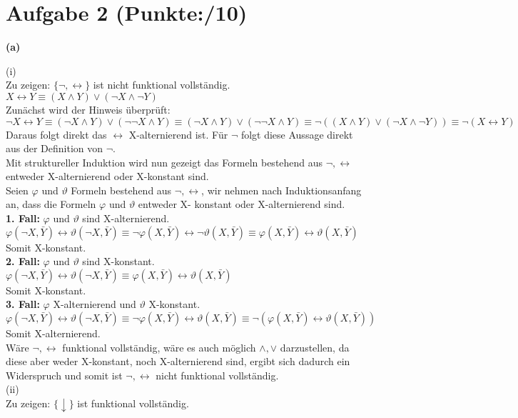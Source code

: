 \documentclass[11pt, a4paper]{article}
\newcommand{\p}{10}
\begin{document}
\section*{Aufgabe 2 (Punkte:\qquad/\p)}
\textbf{(a)}
\begin{adjustwidth}{20pt}{20pt}
(i)\\
Zu zeigen: $\{\neg , \leftrightarrow \}$ ist nicht funktional vollständig.\\
$X \leftrightarrow Y \equiv (X \wedge Y) \vee (\neg X \wedge \neg Y ) $\\ 
Zunächst wird der Hinweis überprüft:\\
$\neg X \leftrightarrow Y \equiv ( \neg X \wedge Y) \vee ( \neg \neg X \wedge Y) \equiv ( 
\neg X \wedge Y) \vee ( \neg \neg X \wedge Y) \equiv \neg ((X \wedge Y) \vee (\neg X
\wedge \neg Y )) \equiv \neg ( X \leftrightarrow Y ) $\\
Daraus folgt direkt das $\leftrightarrow$ X-alternierend ist. Für $\neg$ folgt diese
Aussage direkt aus der Definition von $\neg$.\\
Mit struktureller Induktion wird nun gezeigt das Formeln bestehend aus ${ \neg ,
\leftrightarrow}$ entweder X-alternierend oder X-konstant sind.\\
Seien $\varphi$ und $\vartheta$ Formeln bestehend aus ${\neg ,\leftrightarrow}$, wir
nehmen nach Induktionsanfang an, dass die Formeln $\varphi$ und $\vartheta$ entweder X-
konstant oder X-alternierend sind.\\
\textbf{1. Fall:} $\varphi$ und $\vartheta$ sind X-alternierend.\\
 $ \varphi (\neg X , \bar{Y} ) \leftrightarrow \vartheta (\neg X , \bar{Y} )  \equiv  \neg \varphi( X , \bar{Y} ) \leftrightarrow \neg \vartheta( X , \bar{Y} ) \equiv  \varphi ( X , \bar{Y} ) \leftrightarrow \vartheta ( X , \bar{Y} ) $\\
Somit X-konstant.\\
\textbf{2. Fall:} $\varphi$ und $\vartheta$ sind X-konstant.\\
 $ \varphi (\neg X , \bar{Y} ) \leftrightarrow \vartheta (\neg X , \bar{Y} )  \equiv   \varphi( X , \bar{Y} ) \leftrightarrow  \vartheta( X , \bar{Y} ) $\\
Somit X-konstant.\\
 \textbf{3. Fall:} $\varphi$ X-alternierend und $\vartheta$ X-konstant.\\
 $ \varphi (\neg X , \bar{Y} ) \leftrightarrow \vartheta (\neg X , \bar{Y} )  \equiv   \neg \varphi( X , \bar{Y} ) \leftrightarrow \vartheta( X , \bar{Y} ) \equiv   \neg (\varphi ( X , \bar{Y} ) \leftrightarrow \vartheta ( X , \bar{Y} )) $\\
Somit X-alternierend.\\
 Wäre ${ \neg , \leftrightarrow} $ funktional vollständig, wäre es auch möglich ${\wedge , \vee}$ darzustellen, da diese aber weder X-konstant, noch X-alternierend sind, ergibt sich dadurch ein Widerspruch und somit ist ${ \neg , \leftrightarrow} $ nicht funktional vollständig.\\
(ii)\\
Zu zeigen: $\{\downarrow\}$ ist funktional vollständig.\\


\end{adjustwidth}
\end{document}
